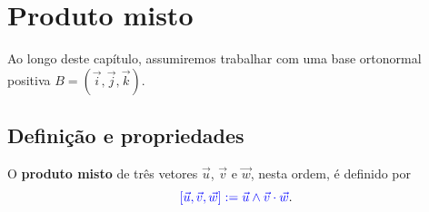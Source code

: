 
\chapter{Produto misto}\label{cap_prodmisto}
\badgeRevisar

Ao longo deste capítulo, assumiremos trabalhar com uma base ortonormal positiva $B = (\vec{i},\vec{j},\vec{k})$.

\section{Definição e propriedades}\label{cap_prodmisto_sec_defn}
\badgeRevisar

O {\bf produto misto} de três vetores $\vec{u}$, $\vec{v}$ e $\vec{w}$, nesta ordem, é definido por
\begin{equation}
  {\color{blue}[\vec{u},\vec{v},\vec{w}] := \vec{u}\land\vec{v}\cdot\vec{w}}.
\end{equation}


